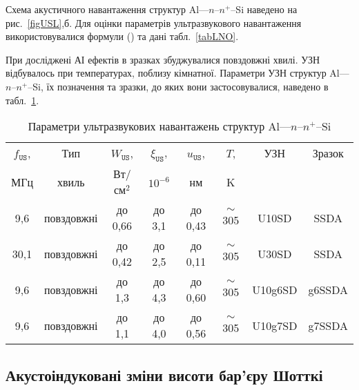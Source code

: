 Схема акустичного навантаження структур Al---$n$--$n^+$--Si наведено на рис.~\ref{figUSL},б.
Для оцінки параметрів ультразвукового навантаження використовувалися формули () та дані табл.~\ref{tabLNO}.




При досліджені АІ ефектів в зразках збуджувалися повздовжні хвилі.
УЗН відбувалось при температурах, поблизу кімнатної.
Параметри УЗН структур Al---$n$--$n^+$--Si, їх позначення та зразки, до яких вони застосовувалися, наведено в табл.~\ref{tabUSL:SD}.

\begin{table}
\caption{\label{tabUSL:SD}Параметри ультразвукових навантажень структур Al---$n$--$n^+$--Si
}
\center
\begin{tabular}{|c|c|c|c|c|c|c|c|}
\hline
$f_\mathtt{US}$,&Тип&$W_{\mathtt{US}}$,&$\xi_{\mathtt{US}}$,&$u_{\mathtt{US}}$,&$T$,&УЗН&Зразок\\
МГц&хвиль&Вт/см$^2$&$10^{-6}$&нм&K&&\\
\hline
9,6&повздовжні&до 0,66&до 3,1&до 0,43&$\sim$305&U10SD&SSDA\\ \hline
30,1&повздовжні&до 0,42&до 2,5&до 0,11&$\sim$305&U30SD&SSDA\\ \hline
9,6&повздовжні&до 1,3&до 4,3&до 0,60&$\sim$305&U10g6SD&g6SSDA\\ \hline
9,6&повздовжні&до 1,1&до 4,0&до 0,56&$\sim$305&U10g7SD&g7SSDA\\ \hline
\end{tabular}
\end{table}


\subsection{Акустоіндуковані зміни висоти бар'єру Шотткі}

